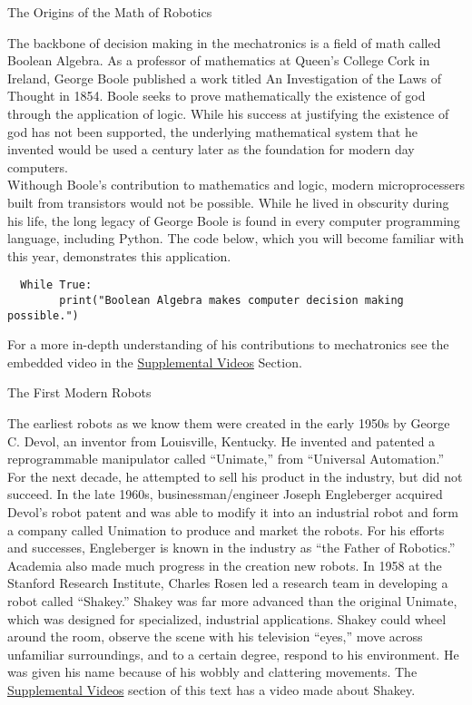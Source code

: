 \documentclass[
]{book}
\begin{document}
The Origins of the Math of Robotics

The backbone of decision making in the mechatronics is a field of math called Boolean Algebra. As a professor of mathematics at Queen's College Cork in Ireland, George Boole published a work titled An Investigation of the Laws of Thought in 1854. Boole seeks to prove mathematically the existence of god through the application of logic. While his success at justifying the existence of god has not been supported, the underlying mathematical system that he invented would be used a century later as the foundation for modern day computers.\\
Withough Boole's contribution to mathematics and logic, modern microprocessers built from transistors would not be possible. While he lived in obscurity during his life, the long legacy of George Boole is found in every computer programming language, including Python. The code below, which you will become familiar with this year, demonstrates this application.

\begin{verbatim}
  While True:
        print("Boolean Algebra makes computer decision making possible.")
\end{verbatim}

For a more in-depth understanding of his contributions to mechatronics see the embedded video in the \protect\hyperlink{supplemental-videos}{Supplemental Videos} Section.

The First Modern Robots

The earliest robots as we know them were created in the early 1950s by George C. Devol, an inventor from Louisville, Kentucky. He invented and patented a reprogrammable manipulator called ``Unimate,'' from ``Universal Automation.'' For the next decade, he attempted to sell his product in the industry, but did not succeed. In the late 1960s, businessman/engineer Joseph Engleberger acquired Devol's robot patent and was able to modify it into an industrial robot and form a company called Unimation to produce and market the robots. For his efforts and successes, Engleberger is known in the industry as ``the Father of Robotics.''
Academia also made much progress in the creation new robots. In 1958 at the Stanford Research Institute, Charles Rosen led a research team in developing a robot called ``Shakey.'' Shakey was far more advanced than the original Unimate, which was designed for specialized, industrial applications. Shakey could wheel around the room, observe the scene with his television ``eyes,'' move across unfamiliar surroundings, and to a certain degree, respond to his environment. He was given his name because of his wobbly and clattering movements. The \protect\hyperlink{supplemental-videos}{Supplemental Videos} section of this text has a video made about Shakey.
\end{document}
